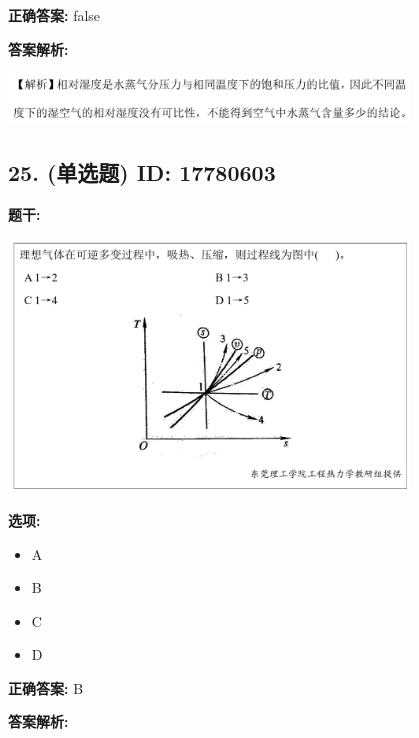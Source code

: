 \documentclass[12pt]{article}
\begin{document}
\textbf{正确答案:}
false

\textbf{答案解析:}


\begin{center}\includegraphics[width=0.8\textwidth, height=0.25\textheight, keepaspectratio]{question_24_17780641/correct_replay_img_1.png}\end{center}

\vspace{0.5em}\hrulefill\vspace{1em}

\subsection*{25. (单选题) \small ID: 17780603}

\textbf{题干:}


\begin{center}\includegraphics[width=0.8\textwidth, height=0.25\textheight, keepaspectratio]{question_25_17780603/title_img_1.png}\end{center}

\textbf{选项:}
\begin{itemize}[leftmargin=*]
  \item A

  \item B

  \item C

  \item D

\end{itemize}

\textbf{正确答案:}
B

\textbf{答案解析:}
\end{document}
